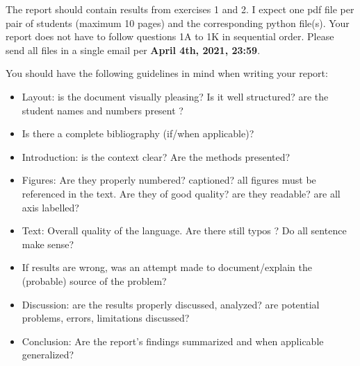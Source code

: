 The report should contain results from exercises 1 and 2. I expect one pdf file per pair of students
(maximum 10 pages) and the corresponding python file(s). 
Your report does not have to follow questions 1A to 1K in sequential order. 
Please send all files in a single email per {\bf April 4th, 2021, 23:59}. 

You should have the following guidelines in mind when writing your report:
\begin{itemize}
\item Layout: is the document visually pleasing? Is it well structured? are the student names 
and numbers present ?
\item Is there a complete bibliography (if/when applicable)?
\item Introduction: is the context clear? Are the methods presented?
\item Figures: Are they properly numbered? captioned? all figures must be referenced in the text. 
Are they of good quality? are they readable? are all axis labelled?
\item Text: Overall quality of the language. Are there still typos ? Do all sentence make sense?
\item If results are wrong, was an attempt made to document/explain the (probable) source
of the problem?
\item Discussion: are the results properly discussed, analyzed? are potential problems, 
errors, limitations discussed?
\item Conclusion: Are the report's findings summarized and when applicable generalized?
\end{itemize}




